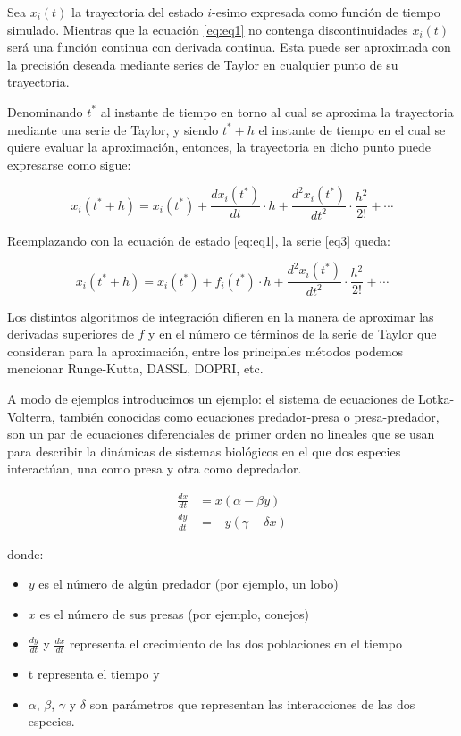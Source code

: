 	Sea $x_i (t)$ la trayectoria del estado $i$-esimo expresada como función de tiempo simulado. 
	Mientras que la ecuación  \eqref{eq:eq1} no contenga discontinuidades $x_i (t)$ será una función continua con derivada continua. 
	Esta puede ser aproximada con la precisión deseada mediante series de Taylor en cualquier punto de su trayectoria.

	Denominando $t^{\ast}$ al instante de tiempo en torno al cual se aproxima la trayectoria mediante una serie de Taylor, y siendo $t^{\ast} + h$
	 el instante de tiempo en el cual se quiere evaluar la aproximación, entonces, la trayectoria en dicho punto puede expresarse como sigue:

	\begin{equation} \label{eq3}
		x_i(t^* + h) = x_i(t^*) + \frac{dx_i (t^*)}{dt} \cdot h + \frac{d^{2}x_i (t^*)}{dt^2} \cdot \frac{h^2}{2!} + \cdots
	\end{equation}

	Reemplazando con la ecuación de estado \ref{eq:eq1}, la serie \eqref{eq3} queda:

	\begin{equation} \label{eq4}
		x_i(t^* + h) = x_i(t^*) + f_i(t^*) \cdot h + \frac{d^{2}x_i (t^*)}{dt^2} \cdot \frac{h^2}{2!} + \cdots
	\end{equation}

	Los distintos algoritmos de integración difieren en la manera de aproximar las derivadas superiores de $f$ y en el número de
	 términos de la serie de Taylor que consideran para la aproximación, entre los principales métodos podemos mencionar Runge-Kutta, DASSL, DOPRI, etc.

	A modo de ejemplos introducimos un ejemplo: el sistema de ecuaciones de Lotka-Volterra, también conocidas como ecuaciones predador-presa o presa-predador,
	son un par de ecuaciones diferenciales de primer orden no lineales que se usan para describir la dinámicas de sistemas biológicos en el que dos 
	especies interactúan, una como presa y otra como depredador.

	\begin{align*}
		\frac{dx}{dt} &= x(\alpha - \beta y) \\
		\frac{dy}{dt} &= - y(\gamma - \delta  x)
	\end{align*}

	donde:
	\begin{itemize}
		\item $y$ es el número de algún predador (por ejemplo, un lobo)
		\item $x$ es el número de sus presas (por ejemplo, conejos)
		\item $\frac{dy}{dt}$ y $\frac{dx}{dt}$ representa el crecimiento de las dos poblaciones en el tiempo
		\item t representa el tiempo y
		\item $\alpha$, $\beta$, $\gamma$ y $\delta$ son parámetros que representan las interacciones de las dos especies.
	\end{itemize}

